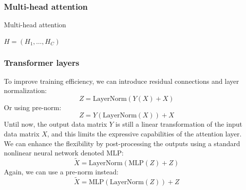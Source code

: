 \documentclass{beamer}
\begin{document}
\begin{frame}
    \frametitle{Multi-head attention}
    \begin{algorithm}[H]
        \caption{Multi-head attention}
        $H=(H_{1},\hdots,H_{C})$\;
        \;
    \end{algorithm}
\end{frame}

\begin{frame}
    \frametitle{Transformer layers}
    To improve training efficiency, we can introduce residual connections and layer normalization:
    \begin{equation*}
        Z=\mathrm{LayerNorm}(Y(X)+X)
    \end{equation*}
    Or using pre-norm:
    \begin{equation*}
        Z=Y(\mathrm{LayerNorm}(X))+X
    \end{equation*}
    Until now, the output data matrix $Y$ is still a linear transformation of the input data matrix $X$, and this limits the expressive capabilities of the attention layer. We can enhance the flexibility by post-processing the outputs using a standard nonlinear neural network denoted $\mathrm{MLP}$:
    \begin{equation*}
        \tilde{X}=\mathrm{LayerNorm}(\mathrm{MLP}(Z)+Z)
    \end{equation*}
    Again, we can use a pre-norm instead:
    \begin{equation*}
        \tilde{X}=\mathrm{MLP}(\mathrm{LayerNorm}(Z))+Z
    \end{equation*}
\end{frame}
\end{document}

